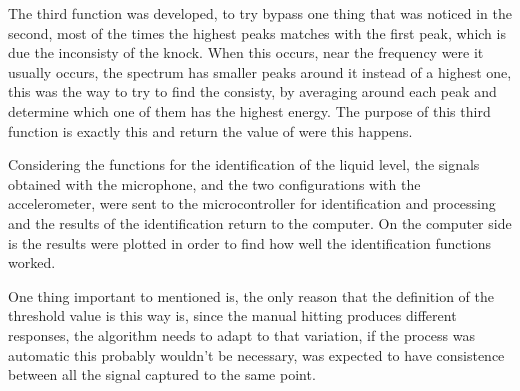 The third function was developed, to try bypass one thing that was noticed in the second, most of the times the highest peaks matches with the first peak, which is due the inconsisty of the knock. When this occurs, near the frequency were it usually occurs, the spectrum has smaller peaks around it instead of a highest one, this was the way to try to find the consisty, by averaging around each peak and determine which one of them has the highest energy. The purpose of this third function is exactly this and return the value of were this happens.

Considering the functions for the identification of the liquid level, the signals obtained with the microphone, and the two configurations with the accelerometer, were sent to the microcontroller for identification and processing and the results of the identification return to the computer. On the computer side is the results were plotted in order to find how well the identification functions worked. 

One thing important to mentioned is, the only reason that the definition of the threshold value is this way is, since the manual hitting produces different responses, the algorithm needs to adapt to that variation, if the process was automatic this probably wouldn't be necessary, was expected to have consistence between all the signal captured to the same point.  
